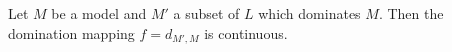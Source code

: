 Let $M$ be a model and $M'$ a subset of $L$ which dominates $M$. Then the domination mapping $f = d_{M',M}$ is continuous.